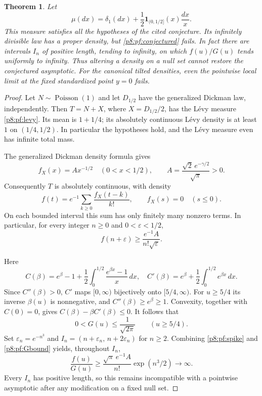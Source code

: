 \documentclass[11pt,a4paper]{article}
\newtheorem{theorem}{Theorem}[section]
\theoremstyle{definition}
\theoremstyle{remark}
\numberwithin{equation}{section}
\begin{document}
\begin{theorem}\label{p8:pf:counterexample}
Let
\begin{equation}\label{p8:pf:levy}
 \mu(dx)=\delta_1(dx)+\frac12\mathbf1_{(0,1/2]}(x)\frac{dx}{x}.
\end{equation}
This measure satisfies all the hypotheses of the cited conjecture.
Its infinitely divisible law has a proper density, but
\eqref{p8:pf:conjectured} fails. In fact there are intervals $I_n$ of positive
length, tending to infinity, on which $f(u)/G(u)$ tends uniformly to
infinity. Thus altering a density on a null set cannot restore the
conjectured asymptotic. For the canonical tilted densities, even the
pointwise local limit at the fixed standardized point $y=0$ fails.
\end{theorem}
\begin{proof}
Let $N\sim\operatorname{Poisson}(1)$ and let $D_{1/2}$ have the generalized
Dickman law, independently. Then $T=N+X$, where $X=D_{1/2}/2$, has the
L\'evy measure \eqref{p8:pf:levy}. Its mean is $1+1/4$; its absolutely
continuous L\'evy density is at least $1$ on $(1/4,1/2)$. In particular
the hypotheses hold, and the L\'evy measure even has infinite total mass.

The generalized Dickman density formula
\cite[Section~1]{p8:PinskyDickman2016} gives
\[
 f_X(x)=A x^{-1/2}\quad(0<x<1/2),\qquad
 A=\frac{\sqrt2\,e^{-\gamma/2}}{\sqrt\pi}>0.
\]
Consequently $T$ is absolutely continuous, with density
\[
 f(t)=e^{-1}\sum_{k\geq0}\frac{f_X(t-k)}{k!},
 \qquad f_X(s)=0\quad(s\leq0).
\]
On each bounded interval this sum has only finitely many nonzero terms.
In particular, for every integer $n\geq0$ and $0<\varepsilon<1/2$,
\begin{equation}\label{p8:pf:spike}
 f(n+\varepsilon)\geq\frac{e^{-1}A}{n!\sqrt\varepsilon}.
\end{equation}

Here
\[
 C(\beta)=e^\beta-1+
       \frac12\int_0^{1/2}\frac{e^{\beta x}-1}{x}\,dx,
 \quad
 C'(\beta)=e^\beta+\frac12\int_0^{1/2}e^{\beta x}\,dx.
\]
Since $C''(\beta)>0$, $C'$ maps $[0,\infty)$ bijectively onto
$[5/4,\infty)$. For $u\geq5/4$ its inverse $\beta(u)$ is nonnegative,
and $C''(\beta)\geq e^\beta\geq1$. Convexity, together with $C(0)=0$,
gives $C(\beta)-\beta C'(\beta)\leq0$. It follows that
\begin{equation}\label{p8:pf:Gbound}
 0<G(u)\leq\frac1{\sqrt{2\pi}}\qquad(u\geq5/4).
\end{equation}
Set $\varepsilon_n=e^{-n^3}$ and
$I_n=(n+\varepsilon_n,\,n+2\varepsilon_n)$ for $n\geq2$.
Combining \eqref{p8:pf:spike} and \eqref{p8:pf:Gbound} yields, throughout $I_n$,
\[
 \frac{f(u)}{G(u)}\geq
       \frac{\sqrt\pi\,e^{-1}A}{n!}\exp(n^3/2)
       \longrightarrow\infty.
\]
Every $I_n$ has positive length, so this remains incompatible with a
pointwise asymptotic after any modification on a fixed null set.


\end{proof}
\end{document}
